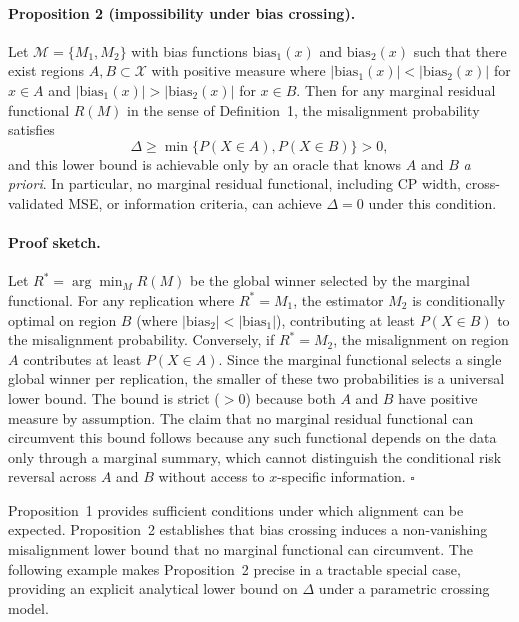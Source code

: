 \documentclass[pdflatex,sn-mathphys-ay]{sn-jnl}%
\theoremstyle{thmstyleone}%
\theoremstyle{thmstyletwo}%
\theoremstyle{thmstylethree}%
\begin{document}
\paragraph{Proposition 2 (impossibility under bias crossing).}
Let $\mathcal{M} = \{M_1, M_2\}$ with bias functions $\text{bias}_1(x)$ and $\text{bias}_2(x)$ such that there exist regions $A, B \subset \mathcal{X}$ with positive measure where $|\text{bias}_1(x)| < |\text{bias}_2(x)|$ for $x \in A$ and $|\text{bias}_1(x)| > |\text{bias}_2(x)|$ for $x \in B$. Then for any marginal residual functional $R(M)$ in the sense of Definition~1, the misalignment probability satisfies
\begin{equation}
    \Delta \geq \min\{P(X \in A), P(X \in B)\} > 0,
\end{equation}
and this lower bound is achievable only by an oracle that knows $A$ and $B$ \emph{a priori}. In particular, no marginal residual functional, including CP width, cross-validated MSE, or information criteria, can achieve $\Delta = 0$ under this condition.

\paragraph{Proof sketch.}
Let $R^* = \arg\min_M R(M)$ be the global winner selected by the marginal functional. For any replication where $R^* = M_1$, the estimator $M_2$ is conditionally optimal on region $B$ (where $|\text{bias}_2| < |\text{bias}_1|$), contributing at least $P(X \in B)$ to the misalignment probability. Conversely, if $R^* = M_2$, the misalignment on region $A$ contributes at least $P(X \in A)$. Since the marginal functional selects a single global winner per replication, the smaller of these two probabilities is a universal lower bound. The bound is strict ($>0$) because both $A$ and $B$ have positive measure by assumption. The claim that no marginal residual functional can circumvent this bound follows because any such functional depends on the data only through a marginal summary, which cannot distinguish the conditional risk reversal across $A$ and $B$ without access to $x$-specific information. $\square$

Proposition~1 provides sufficient conditions under which alignment can be expected. Proposition~2 establishes that bias crossing induces a non-vanishing misalignment lower bound that no marginal functional can circumvent. The following example makes Proposition~2 precise in a tractable special case, providing an explicit analytical lower bound on $\Delta$ under a parametric crossing model.
\end{document}
